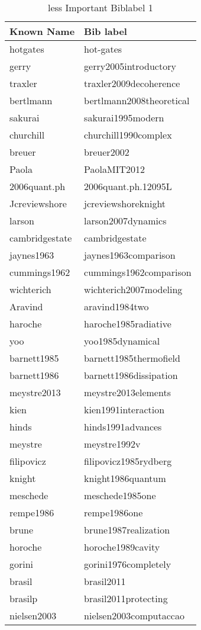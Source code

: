 \documentclass{article}
\begin{document}
\begin{table}[ht]\label{tab:less Important  Biblabel}
\centering
\begin{tabular}{l|l}
Known Name & Bib label \\\hline
hotgates & hot-gates\\
gerry & gerry2005introductory\\
traxler & traxler2009decoherence\\
bertlmann & bertlmann2008theoretical\\
sakurai & sakurai1995modern\\
churchill & churchill1990complex\\
breuer & breuer2002\\
Paola & PaolaMIT2012\\
2006quant.ph  & 2006quant.ph.12095L\\
Jcreviewshore &  jcreviewshoreknight\\
larson  & larson2007dynamics\\
cambridgestate  & cambridgestate\\
jaynes1963 & jaynes1963comparison\\
cummings1962 & cummings1962comparison\\
wichterich  & wichterich2007modeling\\
Aravind & aravind1984two\\
haroche  & haroche1985radiative\\
yoo  & yoo1985dynamical\\
barnett1985 & barnett1985thermofield\\
barnett1986 & barnett1986dissipation\\
meystre2013 & meystre2013elements\\
kien  & kien1991interaction\\
hinds  & hinds1991advances\\
meystre  & meystre1992v\\
filipovicz  & filipovicz1985rydberg\\
knight  & knight1986quantum\\
meschede  & meschede1985one\\
rempe1986 & rempe1986one\\
brune  & brune1987realization\\
horoche  & horoche1989cavity\\
gorini  & gorini1976completely\\
brasil  & brasil2011\\
brasilp & brasil2011protecting\\
nielsen2003 & nielsen2003computaccao
\end{tabular}
\caption{less Important  Biblabel 1}
\end{table} 
\newpage
\end{document}
